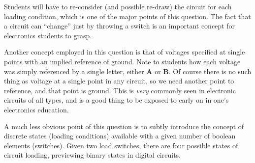 





Students will have to re-consider (and possible re-draw) the circuit for each loading condition, which is one of the major points of this question.  The fact that a circuit can ``change'' just by throwing a switch is an important concept for electronics students to grasp.  

Another concept employed in this question is that of voltages specified at single points with an implied reference of ground.  Note to students how each voltage was simply referenced by a single letter, either {\bf A} or {\bf B}.  Of course there is no such thing as voltage at a single point in any circuit, so we need another point to reference, and that point is ground.  This is {\it very} commonly seen in electronic circuits of all types, and is a good thing to be exposed to early on in one's electronics education.

A much less obvious point of this question is to subtly introduce the concept of discrete states (loading conditions) available with a given number of boolean elements (switches).  Given two load switches, there are four possible states of circuit loading, previewing binary states in digital circuits.




